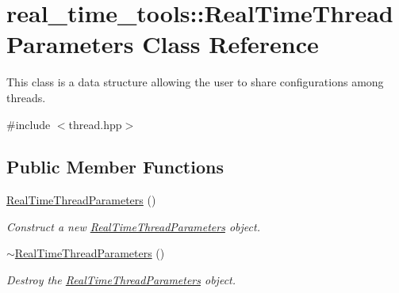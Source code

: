 \hypertarget{classreal__time__tools_1_1RealTimeThreadParameters}{}\section{real\+\_\+time\+\_\+tools\+:\+:Real\+Time\+Thread\+Parameters Class Reference}
\label{classreal__time__tools_1_1RealTimeThreadParameters}


This class is a data structure allowing the user to share configurations among threads.  




{\ttfamily \#include $<$thread.\+hpp$>$}

\subsection*{Public Member Functions}
\begin{DoxyCompactItemize}
\item 
\mbox{\label{classreal__time__tools_1_1RealTimeThreadParameters_a3c23c4f6a5b8ac991072e247f536fcd8}} 
\hyperlink{classreal__time__tools_1_1RealTimeThreadParameters_a3c23c4f6a5b8ac991072e247f536fcd8}{Real\+Time\+Thread\+Parameters} ()
\begin{DoxyCompactList}\small\item\em Construct a new \hyperlink{classreal__time__tools_1_1RealTimeThreadParameters}{Real\+Time\+Thread\+Parameters} object. \end{DoxyCompactList}\item 
\mbox{\label{classreal__time__tools_1_1RealTimeThreadParameters_a9b6720cd9e0da2ad81e22e337a76d7ea}} 
\hyperlink{classreal__time__tools_1_1RealTimeThreadParameters_a9b6720cd9e0da2ad81e22e337a76d7ea}{$\sim$\+Real\+Time\+Thread\+Parameters} ()
\begin{DoxyCompactList}\small\item\em Destroy the \hyperlink{classreal__time__tools_1_1RealTimeThreadParameters}{Real\+Time\+Thread\+Parameters} object. \end{DoxyCompactList}\end{DoxyCompactItemize}
